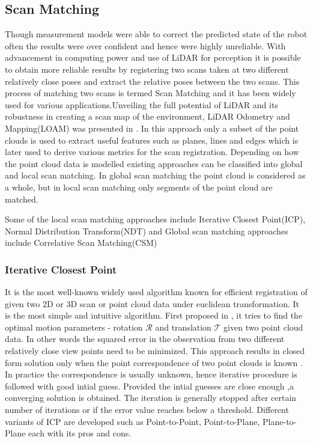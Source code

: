 \subsection{Scan Matching}
    Though measurement models were able to correct the predicted state of the robot often the results were over confident and hence were highly unreliable. With advancement in computing power and use of
LiDAR for perception it is possible to obtain more reliable results by registering two scans taken at two different relatively close poses and extract the relative poses between the two scans. 
This process of matching two scans is termed Scan Matching and it has been widely used for various applications.Unveiling the full potential of LiDAR and its robustness in creating a scan map of the environment,
LiDAR Odometry and Mapping(LOAM) was presented in \cite{ZhangS14}. In this approach only a subset of the point clouds is used to extract useful features such as planes, lines and edges which is later 
used to derive various metrics for the scan registration. 
Depending on how the point cloud data is modelled existing approaches can be classified into 
global and local scan matching. In global scan matching the point cloud is considered as a whole, but in local scan matching only segments of the point cloud are matched.

Some of the local scan matching approaches include Iterative Closest Point(ICP), Normal  Distribution Transform(NDT) and Global scan matching approaches include Correlative Scan Matching(CSM)

\subsubsection{Iterative Closest Point}
    It is the most well-known widely used algorithm known for  efficient registration of given two 2D or 3D scan or point cloud data under euclidean transformation. It is the most simple and intuitive algorithm.
First proposed in \cite{KS.Arun}, it tries to find the optimal motion parameters - rotation $\mathcal{R}$ and translation $\mathcal{T}$ given two point cloud data. In other words the squared error in the observation 
from two different relatively close view points need to be minimized. This approach results in closed form solution only when the point correspondence of two point clouds is known .
In practice the correspondence is usually unknown, hence iterative procedure is followed with good intial guess. Provided the intial guesses are close enough ,a converging solution is obtained. The iteration
is generally stopped after certain number of iterations or if the error value reaches below a threshold. Different variants of ICP are developed such as Point-to-Point, Point-to-Plane, Plane-to-Plane each with its
pros and cons. 

